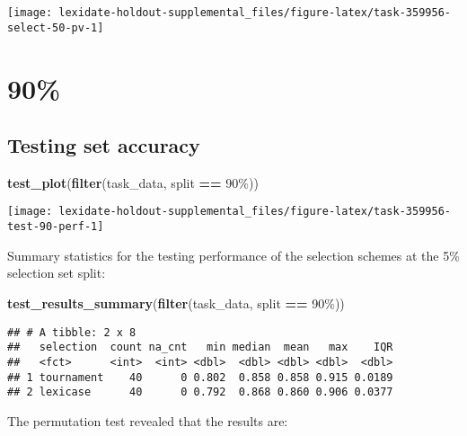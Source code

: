 \documentclass[
]{book}
\newenvironment{Shaded}{\begin{snugshade}}{\end{snugshade}}
\newcommand{\FunctionTok}[1]{\textcolor[rgb]{0.13,0.29,0.53}{\textbf{#1}}}
\newcommand{\NormalTok}[1]{#1}
\newcommand{\SpecialCharTok}[1]{\textcolor[rgb]{0.81,0.36,0.00}{\textbf{#1}}}
\newcommand{\StringTok}[1]{\textcolor[rgb]{0.31,0.60,0.02}{#1}}
\begin{document}
\texttt{[image: lexidate-holdout-supplemental\_files/figure-latex/task-359956-select-50-pv-1]}

\hypertarget{section-28}{%
\section{90\%}\label{section-28}}

\hypertarget{testing-set-accuracy-28}{%
\subsection{Testing set accuracy}\label{testing-set-accuracy-28}}

\begin{Shaded}
\begin{Highlighting}[]
\FunctionTok{test\_plot}\NormalTok{(}\FunctionTok{filter}\NormalTok{(task\_data, split }\SpecialCharTok{==} \StringTok{\textquotesingle{}90\%\textquotesingle{}}\NormalTok{))}
\end{Highlighting}
\end{Shaded}

\texttt{[image: lexidate-holdout-supplemental\_files/figure-latex/task-359956-test-90-perf-1]}

Summary statistics for the testing performance of the selection schemes at the 5\% selection set split:

\begin{Shaded}
\begin{Highlighting}[]
\FunctionTok{test\_results\_summary}\NormalTok{(}\FunctionTok{filter}\NormalTok{(task\_data, split }\SpecialCharTok{==} \StringTok{\textquotesingle{}90\%\textquotesingle{}}\NormalTok{))}
\end{Highlighting}
\end{Shaded}

\begin{verbatim}
## # A tibble: 2 x 8
##   selection  count na_cnt   min median  mean   max    IQR
##   <fct>      <int>  <int> <dbl>  <dbl> <dbl> <dbl>  <dbl>
## 1 tournament    40      0 0.802  0.858 0.858 0.915 0.0189
## 2 lexicase      40      0 0.792  0.868 0.860 0.906 0.0377
\end{verbatim}

The permutation test revealed that the results are:
\end{document}
